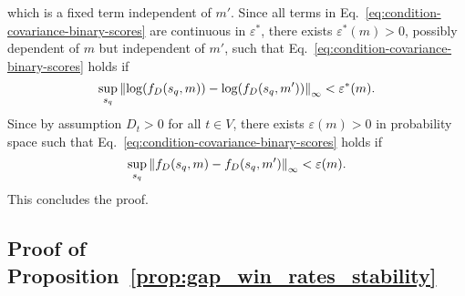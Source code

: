 %
which is a fixed term independent of $m'$. Since all terms in Eq.~\ref{eq:condition-covariance-binary-scores} are continuous in $\varepsilon^*$, there exists $\varepsilon^*(m) >0 $, possibly dependent of $m$ but independent of $m'$, such that Eq.~\ref{eq:condition-covariance-binary-scores} holds if
\begin{equation*}
    \sup_{s_q} \left\lVert\log(f_D(s_q,m))-\log(f_D(s_q, m'))\right\rVert_\infty < \varepsilon^*(m).
\end{equation*}
Since by assumption $D_t>0$ for all $t\in V$, there exists $\varepsilon(m)>0$ in probability space such that Eq.~\ref{eq:condition-covariance-binary-scores} holds if
\begin{equation*}
    \sup_{s_q} \left\lVert f_D(s_q,m)-f_D(s_q, m')\right\rVert_\infty < \varepsilon(m).
\end{equation*}
%
This concludes the proof.

\subsection{Proof of Proposition~\ref{prop:gap_win_rates_stability}}

